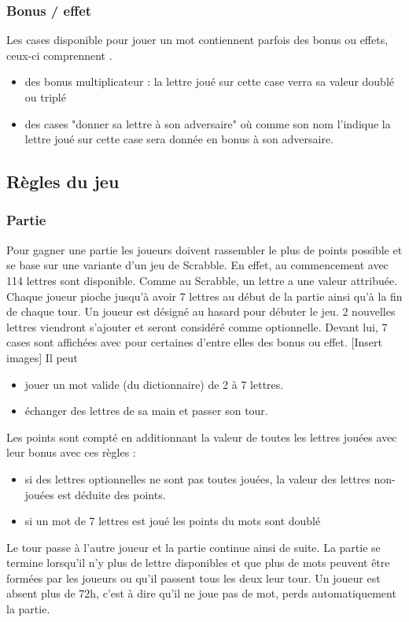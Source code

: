 \documentclass[a4paper,12pt]{article}
\begin{document}
			\subsubsection{Bonus / effet}
			Les cases disponible pour jouer un mot contiennent parfois des bonus ou effets, ceux-ci comprennent .
			\begin{itemize}
				\item des bonus multiplicateur : la lettre joué sur cette case verra sa valeur doublé ou triplé
				\item des cases "donner sa lettre à son adversaire" où comme son nom l'indique la lettre joué sur cette case sera donnée en bonus à son adversaire.
			\end{itemize}
		
		\subsection{Règles du jeu}
			\subsubsection{Partie}
			Pour gagner une partie les joueurs doivent rassembler le plus de points possible et se base sur une variante d'un jeu de Scrabble.
			En effet, au commencement avec 114 lettres sont disponible. Comme au Scrabble, un lettre a une valeur attribuée. \newline
			 Chaque joueur pioche jusqu'à avoir 7 lettres au début de la partie ainsi qu'à la fin de chaque tour. Un joueur est désigné au hasard pour débuter le jeu. 2 nouvelles lettres viendront s'ajouter et seront considéré comme optionnelle. Devant lui, 7 cases sont affichées avec pour certaines d'entre elles des bonus ou effet.
			[Insert images]
			Il peut 
			\begin{itemize}
				\item jouer un mot valide (du dictionnaire) de 2 à 7 lettres.
				\item échanger des lettres de sa main et passer son tour.
			\end{itemize}
			Les points sont compté en additionnant la valeur de toutes les lettres jouées avec leur bonus avec ces règles : 
			\begin{itemize}
				\item si des lettres optionnelles ne sont pas toutes jouées, la valeur des lettres non-jouées est déduite des points.
				\item si un mot de 7 lettres est joué les points du mots sont doublé
			\end{itemize}
			Le tour passe à l'autre joueur et la partie continue ainsi de suite.
			La partie se termine lorsqu'il n'y plus de lettre disponibles et que plus de mots peuvent être formées par les joueurs ou qu'il passent tous les deux leur tour. 
			Un joueur est absent plus de 72h, c'est à dire qu'il ne joue pas de mot, perds automatiquement la partie.
\end{document}
